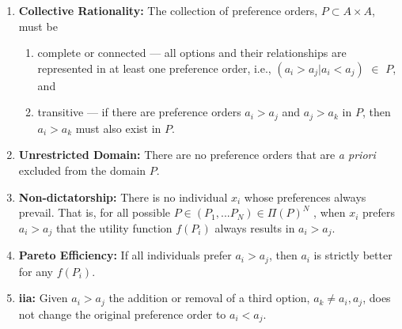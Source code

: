 \begin{enumerate}
    \item \textbf{Collective Rationality:} The collection of preference orders,
    $P \subset A\times A$, must be
    \begin{enumerate}
        \item complete or connected --- all options and their relationships are
        represented in at least one preference order, i.e., $(a_i > a_j | a_i <
        a_j)$ $\in$ $P$, and
        \item transitive --- if there are preference orders $a_i > a_j$ and $a_j
        > a_k$ in $P$, then $a_i > a_k$ must also exist in $P$.
    \end{enumerate}
    \item \textbf{Unrestricted Domain:} There are no preference orders that are
    \textit{a priori} excluded from the domain $P$.
    \item \textbf{Non-dictatorship:} There is no individual $x_i$ whose
    preferences always prevail. That is, for all possible $P \in (P_1, ... P_N)
    \in \Pi(P)^N$ , when $x_i$ prefers $a_i > a_j$ that the utility function
    $f(P_i)$ always results in $a_i > a_j$.
    \item \textbf{Pareto Efficiency:} If all individuals prefer $a_i > a_j$,
    then $a_i$ is strictly better for any $f(P_i)$.
    \item \textbf{\ac{iia}:} Given $a_i > a_j$ the addition or removal of a
    third option, $a_k \neq a_i, a_j$, does not change the original preference
    order to $a_i < a_j$.
\end{enumerate}


